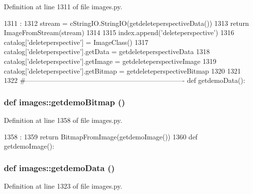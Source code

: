 Definition at line 1311 of file images.py.


\begin{DoxyCode}
1311                                :
1312     stream = cStringIO.StringIO(getdeleteperspectiveData())
1313     return ImageFromStream(stream)
1314 
1315 index.append('deleteperspective')
1316 catalog['deleteperspective'] = ImageClass()
1317 catalog['deleteperspective'].getData = getdeleteperspectiveData
1318 catalog['deleteperspective'].getImage = getdeleteperspectiveImage
1319 catalog['deleteperspective'].getBitmap = getdeleteperspectiveBitmap
1320 
1321 
1322 #----------------------------------------------------------------------
def getdemoData():
\end{DoxyCode}
\hypertarget{namespaceimages_a316cd98fffddcd3793a6378a6a3337ea}{
\subsubsection[{getdemoBitmap}]{\setlength{\rightskip}{0pt plus 5cm}def images::getdemoBitmap ()}}
\label{namespaceimages_a316cd98fffddcd3793a6378a6a3337ea}


Definition at line 1358 of file images.py.


\begin{DoxyCode}
1358                    :
1359     return BitmapFromImage(getdemoImage())
1360 
def getdemoImage():
\end{DoxyCode}
\hypertarget{namespaceimages_a12720cd83f262a032eb623c3e8556b8c}{
\subsubsection[{getdemoData}]{\setlength{\rightskip}{0pt plus 5cm}def images::getdemoData ()}}
\label{namespaceimages_a12720cd83f262a032eb623c3e8556b8c}


Definition at line 1323 of file images.py.


